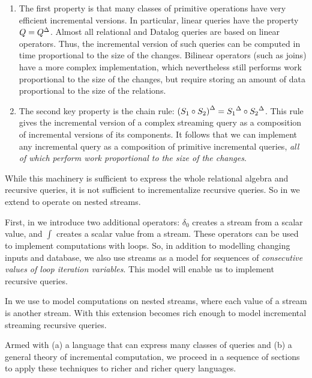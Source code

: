 \begin{enumerate}[label=\textbf{(\arabic*)}]
\item The first property is that many classes of primitive operations have very efficient incremental
versions.  In particular, linear queries have the property $Q = {Q}^{\Delta}$.  Almost all
relational and Datalog queries are based on linear operators.  Thus, the incremental version
of such queries can be computed in time proportional to the size of the changes.  Bilinear 
operators (such as joins) have a more complex implementation, which nevertheless still performs 
work proportional to the size of the changes, but require storing an amount of data proportional
to the size of the relations.

\item The second key property is the chain rule:
${(S_1 \circ S_2)}^{\Delta} = {S_1}^{\Delta} \circ {S_2}^{\Delta}$.  This rule gives the incremental
version of a complex streaming query as a composition of incremental versions of its components.
It follows that we can implement any incremental query as a composition of primitive
incremental queries, \emph{all of which perform work proportional to the size of the changes}.
\end{enumerate}

While this machinery is sufficient to express the whole relational algebra and
recursive queries, it is not sufficient to incrementalize recursive queries.
So in  we extend \dbsp to operate on nested streams.

First, in  we introduce two additional operators: $\delta_0$
creates a stream from a scalar value, and $\int$ creates a scalar value from a stream.  
These operators can be used to implement computations with  loops.
So, in addition to modelling changing inputs and database, we also
use streams as a model for sequences of \emph{consecutive values of loop
iteration variables}.  This model will enable us to implement recursive queries.

In  we use \dbsp to model computations on nested streams, where each 
value of a stream is another stream.  With this extension \dbsp becomes rich enough to
model incremental streaming recursive queries.

Armed with (a) a language that can express many classes of queries and
(b) a  general theory of incremental computation, we proceed in a sequence of
sections to apply these techniques to richer and richer query languages.

